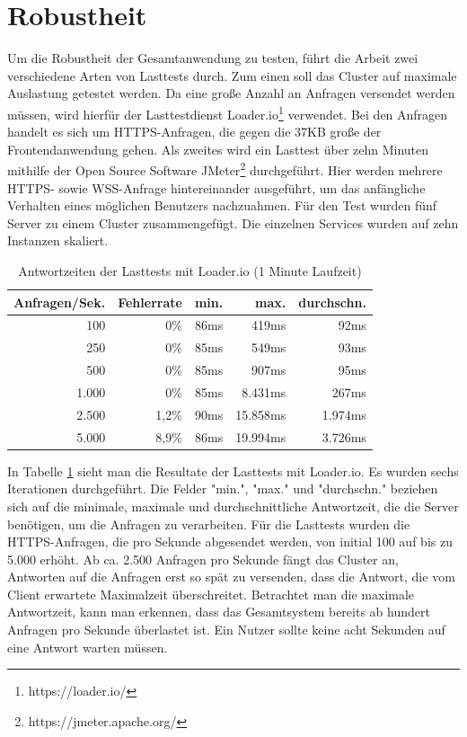 \section{Robustheit}
\label{sec:robustheit}
Um die Robustheit der Gesamtanwendung zu testen, führt die Arbeit zwei verschiedene
Arten von Lasttests durch. Zum einen soll das Cluster auf maximale Auslastung getestet
werden. Da eine große Anzahl an Anfragen versendet werden müssen,
wird hierfür der Lasttestdienst Loader.io\footnote{https://loader.io/} verwendet.
Bei den Anfragen handelt es sich um HTTPS-Anfragen, die gegen
die 37KB große  der Frontendanwendung gehen.
Als zweites wird ein Lasttest über zehn Minuten mithilfe der Open Source Software
JMeter\footnote{https://jmeter.apache.org/} durchgeführt. Hier werden mehrere HTTPS- sowie
WSS-Anfrage hintereinander ausgeführt, um das anfängliche Verhalten eines möglichen Benutzers nachzuahmen.
Für den Test wurden fünf Server zu einem Cluster zusammengefügt. Die einzelnen Services wurden
auf zehn Instanzen skaliert.

\begin{table}[h]
\begin{center}
\begin{tabular}{rrrrr}
Anfragen/Sek. & Fehlerrate & min. & max. & durchschn. \\
\hline
100 &  0\% & 86ms & 419ms & 92ms \\
250 &  0\% & 85ms & 549ms & 93ms \\
500 &  0\% & 85ms & 907ms & 95ms \\
1.000 &  0\% & 85ms & 8.431ms & 267ms \\
2.500 &  1,2\% & 90ms & 15.858ms & 1.974ms \\
5.000 &  8,9\% & 86ms & 19.994ms & 3.726ms \\
\end{tabular}
\end{center}
\caption{Antwortzeiten der Lasttests mit Loader.io (1 Minute Laufzeit)}
\label{tab:resultatdeslasttestsmitloaderio}
\end{table}

In Tabelle \ref{tab:resultatdeslasttestsmitloaderio} sieht man die Resultate
der Lasttests mit Loader.io. Es wurden sechs Iterationen durchgeführt.
Die Felder "min.", "max." und "durchschn." beziehen sich auf die minimale,
maximale und durchschnittliche Antwortzeit, die die Server benötigen, um die
Anfragen zu verarbeiten. Für die Lasttests wurden die HTTPS-Anfragen,
die pro Sekunde abgesendet werden, von initial 100 auf bis zu 5.000 erhöht.
Ab ca. 2.500 Anfragen pro Sekunde fängt das Cluster an, Antworten auf die
Anfragen erst so spät zu versenden, dass die Antwort, die vom Client
erwartete Maximalzeit überschreitet. Betrachtet man die maximale Antwortzeit,
kann man erkennen, dass das Gesamtsystem bereits ab hundert Anfragen pro Sekunde
überlastet ist. Ein Nutzer sollte keine acht Sekunden auf eine Antwort warten
müssen.

